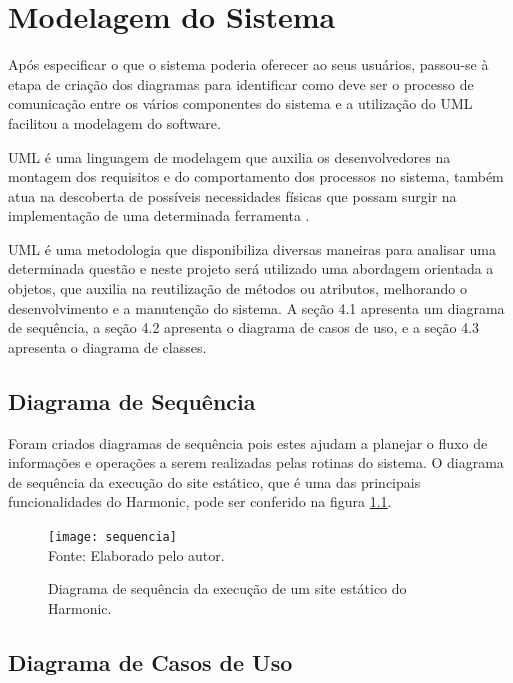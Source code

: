 \documentclass[ppginf, pep]{esinucpel}
\begin{document}
\chapter{Modelagem do Sistema}

Após especificar o que o sistema poderia oferecer ao seus usuários, passou-se à etapa de criação dos diagramas para identificar como deve ser o processo de comunicação entre os vários componentes do sistema e a utilização do UML facilitou a modelagem do software.

UML é uma linguagem de modelagem que auxilia os desenvolvedores na montagem dos requisitos e do comportamento dos processos no sistema, também atua na descoberta de possíveis necessidades físicas que possam surgir na implementação de uma determinada ferramenta \cite{uml}.

UML é uma metodologia que disponibiliza diversas maneiras para analisar uma determinada questão e neste projeto será utilizado uma abordagem orientada a objetos, que auxilia na reutilização de métodos ou atributos, melhorando o desenvolvimento e a manutenção do sistema. A seção 4.1 apresenta um diagrama de sequência, a seção 4.2 apresenta o diagrama de casos de uso, e a seção 4.3 apresenta o diagrama de classes.

\newpage
\section{Diagrama de Sequência}

Foram criados diagramas de sequência pois estes ajudam a planejar o fluxo de informações e operações a serem realizadas pelas rotinas do sistema. O diagrama de sequência da execução do site estático, que é uma das principais funcionalidades do Harmonic, pode ser conferido na figura \ref{fig:sequencia}.

\begin{figure}[H]
    \centering
    \caption{Diagrama de sequência da execução de um site estático do Harmonic.}
    \vspace{5pt}
    \texttt{[image: sequencia]}
    \\Fonte: Elaborado pelo autor.
    \label{fig:sequencia}
\end{figure}

\section{Diagrama de Casos de Uso}
\end{document}
